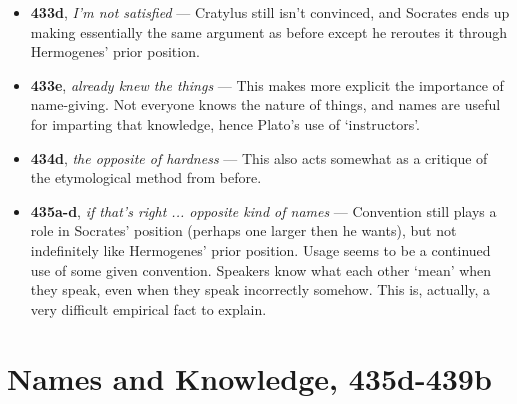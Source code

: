 \documentclass[12pt]{article}
\begin{document}
\begin{itemize}
\item \textbf{433d}, \textit{I'm not satisfied} --- Cratylus still isn't convinced, and Socrates ends up making essentially the same argument as before except he reroutes it through Hermogenes' prior position.

\item \textbf{433e}, \textit{already knew the things} --- This makes more explicit the importance of name-giving. Not everyone knows the nature of things, and names are useful for imparting that knowledge, hence Plato's use of `instructors'.

\item \textbf{434d}, \textit{the opposite of hardness} --- This also acts somewhat as a critique of the etymological method from before.

\item \textbf{435a-d}, \textit{if that's right ... opposite kind of names} --- Convention still plays a role in Socrates' position (perhaps one larger then he wants), but not indefinitely like Hermogenes' prior position. Usage seems to be a continued use of some given convention. Speakers know what each other `mean' when they speak, even when they speak incorrectly somehow. This is, actually, a very difficult empirical fact to explain.

\end{itemize}

\section{Names and Knowledge, 435d-439b}
\end{document}

